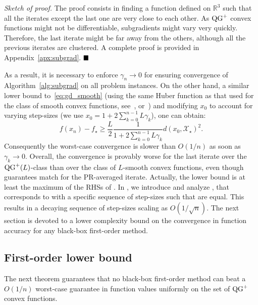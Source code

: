 \noindent \textit{Sketch of proof.}
The proof consists in finding a function defined on $\mathbb{R}^3$ such that all the iterates except the last one are very close to each other. As $\operatorname{QG}^+$ convex functions might not be differentiable, subgradients might vary very quickly. Therefore, the last iterate might be far away from the others, although all the previous iterates are clustered. A complete proof is provided in Appendix~\ref{apx:subgrad}.
$\hfill\blacksquare$

As a result, it is necessary to enforce $\gamma_n \rightarrow 0$ for ensuring convergence of Algorithm~\ref{alg:subgrad} on all problem instances. On the other hand, a similar lower bound to~\eqref{eq:gd_smooth} (using the same Huber function as that used for the class of smooth convex functions, see~\citep{drori2014performance}, or~\citep[Section 4]{taylor2017smooth}) and modifying $x_0$ to account for varying step-sizes (we use $x_0 = 1 + 2 \sum_{k=0}^{n-1} L\gamma_k$), one can obtain:
\begin{equation}
    f(x_n) - f_\star \geq \frac{L}{2}\frac{1}{1 + 2 \sum_{k=0}^{n-1} L\gamma_k} d(x_0, \mathcal{X}_\star)^2. 
    \label{eq:LB_smooth}
\end{equation}
Consequently the worst-case convergence is slower than $O(1 / n)$ as soon as $\gamma_k\rightarrow 0$. Overall, the convergence is provably worse for the last iterate over the $\operatorname{QG}^+(L)$-class than over the class of $L$-smooth convex functions, even though guarantees match for the PR-averaged iterate. Actually, the lower bound is at least the maximum of the RHSs of . In , we introduce and analyze , that corresponds to  with a specific sequence of step-sizes such that  are equal. This results in a decaying sequence of step-sizes scaling as $O(1/\sqrt{n})$. The next section is devoted to a lower complexity bound on the convergence in function accuracy for any black-box first-order method.

        \subsection{First-order lower bound}\label{subsec:first_order_lower_bound}
The next theorem guarantees that no black-box first-order method can beat a $O(1 / n)$ worst-case guarantee in function values uniformly on the set of $\operatorname{QG}^+$ convex functions.

